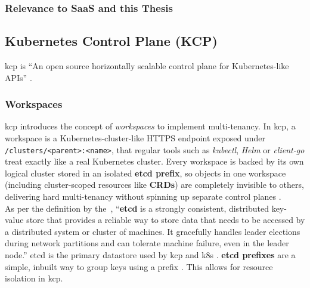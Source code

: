 \documentclass[11pt, a4paper, oneside, listof=totoc]{scrartcl}
\begin{document}
            \subsubsection{Relevance to SaaS and this Thesis}

        \newpage

        \subsection{Kubernetes Control Plane (KCP)}\label{subsec:kcp}
            \gls{kcp} is \enquote{An open source horizontally scalable control plane for
            Kubernetes-like APIs} \parencite{kcpio}.

            \subsubsection{Workspaces}\label{subsubsec:workspaces}
                \gls{kcp} introduces the concept of \textit{workspaces} to implement multi-tenancy.
                In \gls{kcp}, a workspace is a Kubernetes-cluster-like HTTPS endpoint exposed under
                \texttt{/clusters/<parent>:<name>}, that regular tools such as \textit{kubectl},
                \textit{Helm} or \textit{client-go} treat exactly like a real Kubernetes cluster.
                Every workspace is backed by its own logical cluster stored in an isolated
                \textbf{etcd prefix}, so objects in one workspace (including cluster-scoped
                resources like \textbf{CRDs}) are completely invisible to others, delivering hard
                multi-tenancy without spinning up separate control planes \parencite{kcpWorkspaces}.
                \\
                As per the definition by the~\cite{etcd}, \enquote{\textbf{etcd} is a strongly
                consistent, distributed key-value store that provides a reliable way to store data
                that needs to be accessed by a distributed system or cluster of machines.
                It gracefully handles leader elections during network partitions and can tolerate
                machine failure, even in the leader node.}
                etcd is the primary datastore used by \gls{kcp} and \gls{k8s}
                \parencites{kcpDevStorageToRest}[p.~214]{sun2021}.
                \textbf{etcd prefixes} are a simple, inbuilt way to group keys using a prefix
                \parencite{etcdPrefix}.
                This allows for resource isolation in \gls{kcp}.\@
\end{document}
